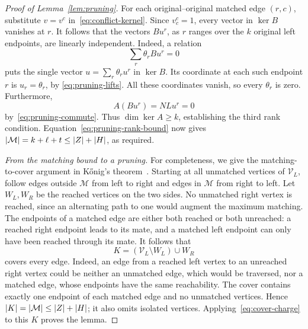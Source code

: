 \begin{proof}[Proof of Lemma~\ref{lem:pruning}]
For each original--original matched edge $(r,c)$, substitute $v=v^c$
in~\eqref{eq:conflict-kernel}.  Since $v^c_c=1$, every vector in
$\ker B$ vanishes at $r$.  It follows that the vectors $Bu^r$, as $r$
ranges over the $k$ original left endpoints, are linearly independent.
Indeed, a relation
\[
 \sum_r\theta_r Bu^r=0
\]
puts the single vector $u=\sum_r\theta_r u^r$ in $\ker B$.
Its coordinate at each such endpoint $r$ is $u_r=\theta_r$, by
\eqref{eq:pruning-lifts}.  All these coordinates vanish, so every
$\theta_r$ is zero.  Furthermore,
\[
 A(Bu^r)=NLu^r=0
\]
by~\eqref{eq:pruning-commute}. Thus $\dim\ker A\geq k$, establishing
the third rank condition. Equation~\eqref{eq:pruning-rank-bound} now gives
$\lvert \mathcal M\rvert=k+\ell+t\leq\lvert Z\rvert+\lvert H\rvert$, as required.

\medskip\noindent
\emph{From the matching bound to a pruning.}
For completeness, we give the matching-to-cover argument in
K\H{o}nig's theorem~\cite{konig1931}.  Starting at all unmatched vertices
of $\mathcal V_L$, follow edges outside $\mathcal M$ from left to
right and edges in $\mathcal M$ from right to left.  Let $W_L,W_R$
be the reached vertices on the two sides.  No unmatched right vertex
is reached, since an alternating path to one would augment the maximum
matching.  The endpoints of a matched edge are either both reached or
both unreached: a reached right endpoint leads to its mate, and a
matched left endpoint can only have been reached through its mate.
It follows that
\[
 K=(\mathcal V_L\setminus W_L)\cup W_R
\]
covers every edge.  Indeed, an edge from a reached left vertex to an
unreached right vertex could be neither an unmatched edge, which would
be traversed, nor a matched edge, whose endpoints have the same
reachability.  The cover contains exactly one endpoint of each matched
edge and no unmatched vertices.  Hence
$\lvert K\rvert=\lvert \mathcal M\rvert\leq\lvert Z\rvert+\lvert H\rvert$; it also omits isolated
vertices.  Applying~\eqref{eq:cover-charge} to this $K$ proves the lemma.
\end{proof}

